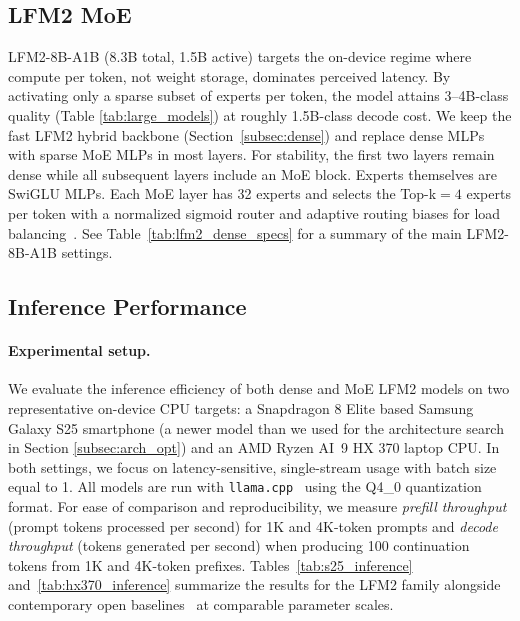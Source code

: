 \documentclass{article}
\begin{document}
\subsection{LFM2 MoE}
\label{subsec:moe}

LFM2-8B-A1B (8.3B total, 1.5B active) targets the on-device regime where compute per token, not weight storage, dominates perceived latency. By activating only a sparse subset of experts per token, the model attains 3–4B-class quality (Table \ref{tab:large_models}) at roughly 1.5B-class decode cost. We keep the fast LFM2 hybrid backbone (Section~\ref{subsec:dense}) and replace dense MLPs with sparse MoE MLPs in most layers. For stability, the first two layers remain dense while all subsequent layers include an MoE block. Experts themselves are SwiGLU MLPs. Each MoE layer has 32 experts and selects the Top-k${=}4$ experts per token with a normalized sigmoid router and adaptive routing biases for load balancing~\citep{liu2024deepseek}. See
Table~\ref{tab:lfm2_dense_specs} for a summary of the main LFM2-8B-A1B settings.



\subsection{Inference Performance}
\label{subsec:inference}

\paragraph{Experimental setup.}
We evaluate the inference efficiency of both dense and MoE LFM2 models on two representative on-device CPU targets: a Snapdragon 8 Elite based Samsung Galaxy S25 smartphone (a newer model than we used for the architecture search in Section \ref{subsec:arch_opt}) and an AMD Ryzen AI~9 HX 370 laptop CPU. In both settings, we focus on latency-sensitive, single-stream usage with batch size equal to 1. All models are run with \texttt{llama.cpp}~\citep{gerganov_llama_cpp} using the Q4\_0 quantization format. For ease of comparison and reproducibility, we measure
\emph{prefill throughput} (prompt tokens processed per second) for 1K and 4K-token prompts and
\emph{decode throughput} (tokens generated per second) when producing 100 continuation tokens from 1K and 4K-token prefixes. Tables~\ref{tab:s25_inference} and~\ref{tab:hx370_inference} summarize the results for the LFM2 family alongside contemporary open baselines~\citep{yang2025qwen3, team2025gemma, grattafiori2024llama, bakouch2025smollm3, granite2025} at comparable parameter scales.
\end{document}
